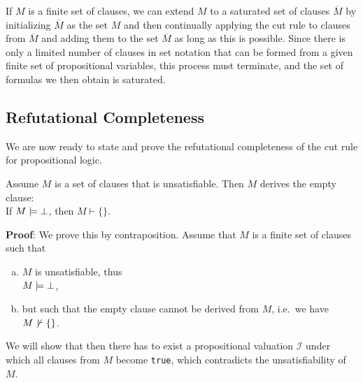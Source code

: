 \remarkEng
If $M$ is a finite set of clauses, we can extend $M$ to a saturated set of clauses
$\overline{M}$ by initializing $\overline{M}$ as the set $M$ and then continually applying the
cut rule to clauses from $\overline{M}$ and adding them to the set $\overline{M}$ as long as this is possible.
Since there is only a limited number of clauses in set notation that can be formed from a given finite set of
propositional variables, this process must terminate, and the set of formulas we then obtain is saturated. \eox 

\subsection{Refutational Completeness}
We are now ready to state and prove the refutational completeness of the cut rule for propositional logic.

\begin{Theorem}[\textcolor{blue}{Refutational Completeness}] \label{widerlegungs-vollstaendig} \hspace*{\fill} \linebreak
  Assume $M$ is a set of clauses that is unsatisfiable.  Then $M$ derives the empty clause:
  \\[0.2cm]
  \hspace*{1.3cm} 
  If $M \models \bot$, then $M \vdash \{\}$.
\end{Theorem}

\noindent
\textbf{Proof}: We prove this by contraposition. Assume that $M$ is a finite set of clauses such that
\begin{enumerate}[(a)]
\item $M$ is unsatisfiable, thus
      \\[0.2cm]
      \hspace*{1.3cm}
      $M \models \bot$,
\item but such that the empty clause cannot be derived from $M$, i.e.~we have
      \\[0.2cm]
      \hspace*{1.3cm}
      $M \not\,\vdash \{\}$.
\end{enumerate}
We will show that then there has to exist a propositional valuation $\mathcal{I}$ under which all clauses
from $M$ become \texttt{true}, which contradicts the unsatisfiability of $M$. 

